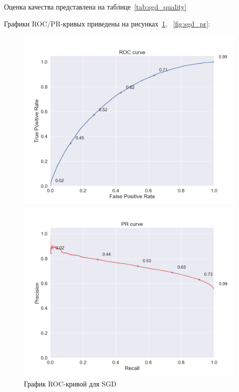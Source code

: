 Оценка качества представлена на таблице~\ref{tab:sgd_quality}

\begin{table}[h]
    \caption{Значения метрик для SGD}
    \label{tab:sgd_quality}
\end{table}

Графики ROC/PR-кривых приведены на рисунках~\ref{fig:sgd_roc}, ~\ref{fig:sgd_pr}:

\begin{figure}[h!]
\centering
\begin{minipage}{.5\textwidth}
\centering
\includegraphics[width=1.0\linewidth]{images/sgd/roc_curve}
\caption{График ROC-кривой для SGD}
\label{fig:sgd_roc}
\end{minipage}%
\begin{minipage}{.5\textwidth}
\centering
\includegraphics[width=1.0\linewidth]{images/sgd/pr_curve}

\end{minipage}
\end{figure}
